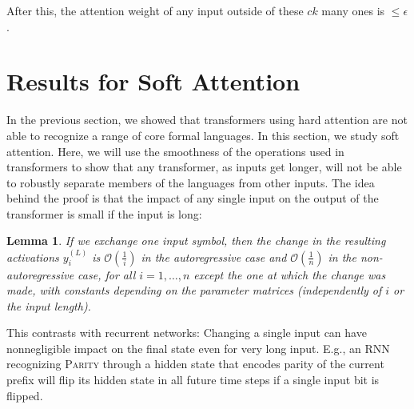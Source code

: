 \documentclass[11pt,a4paper]{article}
\newcounter{theorem}
\newtheorem{lemma}[theorem]{Lemma}
\begin{document}
After this, the attention weight of any input outside of these $ck$ many ones is $\leq \epsilon$.



\section{Results for Soft Attention}\label{sec:soft}



In the previous section, we showed that transformers using hard attention are not able to recognize a range of core formal languages.
In this section, we study soft attention. %
Here, we will use the smoothness of the operations used in transformers to show that any transformer, as inputs get longer, will not be able to robustly separate members of the languages from other inputs.
The idea behind the proof is that the impact of any single input on the output of the transformer is small if the input is long:
\begin{lemma}\label{lemma:diff-1n}
If we exchange one input symbol, %
then the change in the resulting activations $y_i^{(L)}$ is $\mathcal{O}(\frac{1}{i})$ in the autoregressive case and  $\mathcal{O}(\frac{1}{n})$ in the non-autoregressive case, for all $i = 1, \dots, n$ except the one at which the change was made, with constants depending on the parameter matrices (independently of $i$ or the input length).
\end{lemma}
This contrasts with recurrent networks:
Changing a single input can have nonnegligible impact on the final state even for very long input.
E.g., an RNN recognizing \textsc{Parity} through a hidden state that encodes parity of the current prefix will flip its hidden state in all future time steps if a single input bit is flipped.
\end{document}
